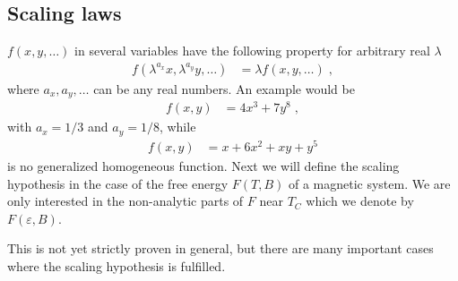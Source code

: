 \subsection{Scaling laws}
 $f(x,y,\ldots)$ in several variables have the 
following property for arbitrary real $\lambda$
%
\begin{align}\label{eq:}
f(\lambda^{a_{x}} x,\lambda^{a_{y}}y,\ldots ) &=\lambda f(x,y,\ldots)\;,
\end{align}
%
where $a_{x},a_{y},\ldots$ can be any real numbers. An example would be
%
\begin{align*}
f(x,y) &= 4 x^{3} + 7 y^{8}\;,
\end{align*}
%
with $a_{x}=1/3$ and $a_{y}=1/8$, while 
%
\begin{align*}
f(x,y) &= x + 6 x^{2} + xy + y^{5}
\end{align*}
%
is no generalized homogeneous function. Next we will define the
{\color{blue}scaling hypothesis} in the case of the free energy $F(T,B)$ of a magnetic system. We are only interested in the non-analytic parts of $F$
near $T_{C}$ which we denote by
$F(\varepsilon,B) $.

This is not yet strictly proven in general, but there are many important
cases where the scaling hypothesis is fulfilled.

